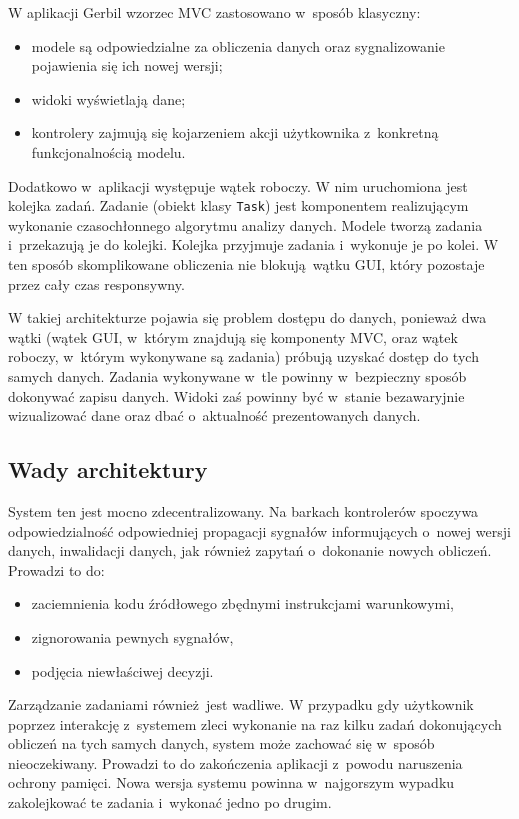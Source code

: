 W aplikacji Gerbil wzorzec MVC zastosowano w~sposób klasyczny: 
\begin{itemize}
	\item modele są odpowiedzialne za obliczenia danych oraz sygnalizowanie pojawienia się ich nowej wersji;
	\item widoki wyświetlają dane;
	\item kontrolery zajmują się kojarzeniem akcji użytkownika z~konkretną funkcjonalnością modelu.
\end{itemize}

Dodatkowo w~aplikacji występuje wątek roboczy. W nim uruchomiona jest kolejka zadań. Zadanie (obiekt klasy \lstinline$Task$) jest komponentem realizującym wykonanie czasochłonnego algorytmu analizy danych. Modele tworzą zadania i~przekazują je do kolejki. Kolejka przyjmuje zadania i~wykonuje je po kolei. W ten sposób skomplikowane obliczenia nie blokują wątku GUI, który pozostaje przez cały czas responsywny.

W takiej architekturze pojawia się problem dostępu do danych, ponieważ dwa wątki (wątek GUI, w~którym znajdują się komponenty MVC, oraz wątek roboczy, w~którym wykonywane są zadania) próbują uzyskać dostęp do tych samych danych. Zadania wykonywane w~tle powinny w~bezpieczny sposób dokonywać zapisu danych. Widoki zaś powinny być w~stanie bezawaryjnie wizualizować dane oraz dbać o~aktualność prezentowanych danych.

\subsection{Wady architektury}

System ten jest mocno zdecentralizowany. Na barkach kontrolerów spoczywa odpowiedzialność odpowiedniej propagacji sygnałów informujących o~nowej wersji danych, inwalidacji danych, jak również zapytań o~dokonanie nowych obliczeń. Prowadzi to do:
\begin{itemize}
	\item zaciemnienia kodu źródłowego zbędnymi instrukcjami warunkowymi,
	\item zignorowania pewnych sygnałów,
	\item podjęcia niewłaściwej decyzji.
\end{itemize}

Zarządzanie zadaniami również jest wadliwe. W przypadku gdy użytkownik poprzez interakcję z~systemem zleci wykonanie na raz kilku zadań dokonujących obliczeń na tych samych danych, system może zachować się w~sposób nieoczekiwany. Prowadzi to do zakończenia aplikacji z~powodu naruszenia ochrony pamięci. Nowa wersja systemu powinna w~najgorszym wypadku zakolejkować te zadania i~wykonać jedno po drugim.

